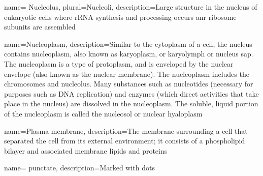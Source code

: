  {
	name= {Nucleolus},
	plural={Nucleoli},
	description={Large structure in the nucleus of eukaryotic cells where rRNA synthesis and processing occurs anr ribosome subunits are assembled\cite{lodish2003molecular}}}


 {
	name={Nucleoplasm},
	description={Similar to the cytoplasm of a cell, the nucleus contains nucleoplasm, also known as karyoplasm, or karyolymph or nucleus sap. The nucleoplasm is a type of protoplasm, and is enveloped by the nuclear envelope (also known as the nuclear membrane). The nucleoplasm includes the chromosomes and nucleolus. Many substances such as nucleotides (necessary for purposes such as DNA replication) and enzymes (which direct activities that take place in the nucleus) are dissolved in the nucleoplasm. The soluble, liquid portion of the nucleoplasm is called the nucleosol or nuclear hyaloplasm\cite{enwiki:972970373}}}

	
 {
	name={Plasma membrane},
	description={The membrane surrounding a cell that separated the cell from its external environment; it consists of a phospholipid bilayer and associated membrane lipids and proteins\cite{lodish2003molecular}}}

 {
	name= {punctate},
	description={Marked with dots}}






